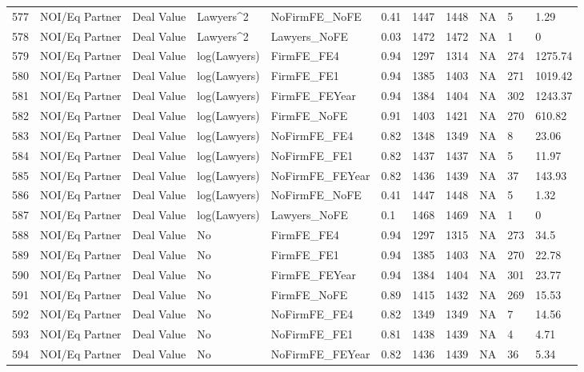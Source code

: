\documentclass{article}
\begin{document}
\begin{table}[H]
\begin{tabular}{rllllllllll}
  577 & NOI/Eq Partner & Deal Value & Lawyers^2 & NoFirmFE\_NoFE & 0.41 & 1447 & 1448 & NA & 5 & 1.29 \\ 
  578 & NOI/Eq Partner & Deal Value & Lawyers^2 & Lawyers\_NoFE & 0.03 & 1472 & 1472 & NA & 1 & 0 \\ 
  579 & NOI/Eq Partner & Deal Value & log(Lawyers) & FirmFE\_FE4 & 0.94 & 1297 & 1314 & NA & 274 & 1275.74 \\ 
  580 & NOI/Eq Partner & Deal Value & log(Lawyers) & FirmFE\_FE1 & 0.94 & 1385 & 1403 & NA & 271 & 1019.42 \\ 
  581 & NOI/Eq Partner & Deal Value & log(Lawyers) & FirmFE\_FEYear & 0.94 & 1384 & 1404 & NA & 302 & 1243.37 \\ 
  582 & NOI/Eq Partner & Deal Value & log(Lawyers) & FirmFE\_NoFE & 0.91 & 1403 & 1421 & NA & 270 & 610.82 \\ 
  583 & NOI/Eq Partner & Deal Value & log(Lawyers) & NoFirmFE\_FE4 & 0.82 & 1348 & 1349 & NA & 8 & 23.06 \\ 
  584 & NOI/Eq Partner & Deal Value & log(Lawyers) & NoFirmFE\_FE1 & 0.82 & 1437 & 1437 & NA & 5 & 11.97 \\ 
  585 & NOI/Eq Partner & Deal Value & log(Lawyers) & NoFirmFE\_FEYear & 0.82 & 1436 & 1439 & NA & 37 & 143.93 \\ 
  586 & NOI/Eq Partner & Deal Value & log(Lawyers) & NoFirmFE\_NoFE & 0.41 & 1447 & 1448 & NA & 5 & 1.32 \\ 
  587 & NOI/Eq Partner & Deal Value & log(Lawyers) & Lawyers\_NoFE & 0.1 & 1468 & 1469 & NA & 1 & 0 \\ 
  588 & NOI/Eq Partner & Deal Value & No & FirmFE\_FE4 & 0.94 & 1297 & 1315 & NA & 273 & 34.5 \\ 
  589 & NOI/Eq Partner & Deal Value & No & FirmFE\_FE1 & 0.94 & 1385 & 1403 & NA & 270 & 22.78 \\ 
  590 & NOI/Eq Partner & Deal Value & No & FirmFE\_FEYear & 0.94 & 1384 & 1404 & NA & 301 & 23.77 \\ 
  591 & NOI/Eq Partner & Deal Value & No & FirmFE\_NoFE & 0.89 & 1415 & 1432 & NA & 269 & 15.53 \\ 
  592 & NOI/Eq Partner & Deal Value & No & NoFirmFE\_FE4 & 0.82 & 1349 & 1349 & NA & 7 & 14.56 \\ 
  593 & NOI/Eq Partner & Deal Value & No & NoFirmFE\_FE1 & 0.81 & 1438 & 1439 & NA & 4 & 4.71 \\ 
  594 & NOI/Eq Partner & Deal Value & No & NoFirmFE\_FEYear & 0.82 & 1436 & 1439 & NA & 36 & 5.34 \\ 

\end{tabular}
\end{table}
\end{document}
